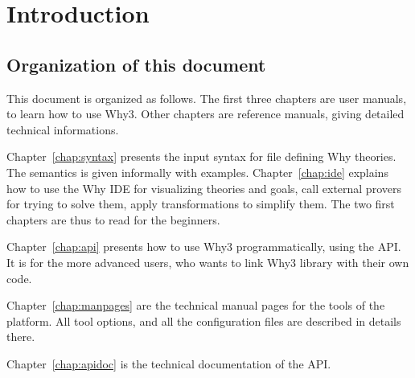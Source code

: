 
\chapter{Introduction}


\section{Organization of this document}

This document is organized as follows. The first three chapters are
user manuals, to learn how to use Why3. Other chapters are reference
manuals, giving detailed technical informations.

Chapter~\ref{chap:syntax} presents the input syntax for file defining
Why theories. The semantics is given informally with examples.
Chapter~\ref{chap:ide} explains how to use the Why IDE for visualizing
theories and goals, call external provers for trying to solve them,
apply transformations to simplify them. The two first chapters are
thus to read for the beginners.

Chapter~\ref{chap:api} presents how to use Why3 programmatically,
using the API.  It is for the more advanced users, who wants to link
Why3 library with their own code. 

Chapter~\ref{chap:manpages} are the technical manual pages for the tools of
the platform. All tool options, and all the configuration files are described in details there.

Chapter~\ref{chap:apidoc} is the technical documentation of the API.



